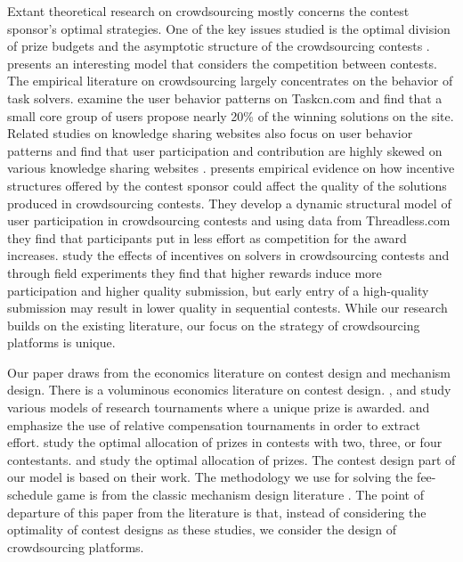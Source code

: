 \documentclass[12pt]{article}
\begin{document}
Extant theoretical research on crowdsourcing mostly concerns the contest
sponsor's optimal strategies. One of the key issues studied is the
optimal division of prize budgets and the asymptotic structure of
the crowdsourcing contests \citep{Archak:2009, Chawla:2011, Ghosh:2012}.
\citet{DiPalantino:2009} presents an interesting model that considers
the competition between contests. The empirical literature
on crowdsourcing largely concentrates on the behavior of task solvers. \citet{Yang:2008}
examine the user behavior patterns on Taskcn.com and find that a small
core group of users propose nearly 20\% of the winning solutions on
the site. Related studies on knowledge sharing websites also focus
on user behavior patterns and find that user participation and contribution
are highly skewed on various knowledge sharing websites \citep{Adler:2007, Golder:2006, Welser:2007}. \citet{Huang:2013}
presents empirical evidence on how incentive structures offered by
the contest sponsor could affect the quality of the solutions produced
in crowdsourcing contests. They develop a dynamic structural model
of user participation in crowdsourcing contests and using data from
Threadless.com they find that participants put in less effort as competition
for the award increases. \citet{Liu:2013} study the effects of incentives
on solvers in crowdsourcing contests and through field experiments
they find that higher rewards induce more participation and higher
quality submission, but early entry of a high-quality submission may
result in lower quality in sequential contests. While our research
builds on the existing literature, our focus on the strategy of crowdsourcing
platforms is unique.

Our paper draws from the economics literature on contest design and
mechanism design. There is a voluminous economics literature on contest
design. \citet{Wright:1983}, \citet{Taylor:1995} and \citet{Fullerton:1999}
study various models of research tournaments where a unique prize
is awarded. \citet{Lazear:1981} and \citet{Nalebuff:1983} emphasize
the use of relative compensation tournaments in order to extract effort.
\citet{Krishna:1998} study the optimal allocation of prizes in contests
with two, three, or four contestants. \citet{Moldovanu:2001} and
\citet{Moldovanu:2006} study the optimal allocation of prizes. The
contest design part of our model is based on their work. The methodology
we use for solving the fee-schedule game is from the classic mechanism
design literature \citep{Baron:1982, Guesnerie:1984}. The point of
departure of this paper from the literature is that, instead of considering
the optimality of contest designs as these studies, we consider the
design of crowdsourcing platforms.
\end{document}
